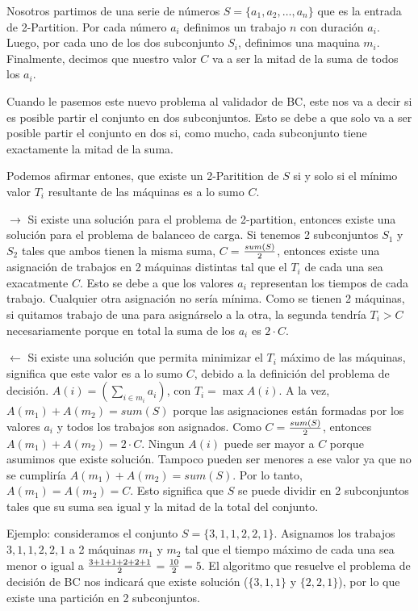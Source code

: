 \documentclass{article}
\begin{document}
Nosotros partimos de una serie de números $S = \{a_1, a_2, \ldots, a_n \}$ que es la entrada de 2-Partition. Por cada número $a_i$ definimos un trabajo $n$ con duración $a_i$.  
Luego, por cada uno de los dos subconjunto $S_i$, definimos una maquina $m_i$. 
Finalmente, decimos que nuestro valor $C$ va a ser la mitad de la suma de todos los $a_i$.

Cuando le pasemos este nuevo problema al validador de BC, este nos va a decir si es posible partir el conjunto en dos subconjuntos. Esto se debe a que solo va a ser posible partir el conjunto en dos si, como mucho, cada subconjunto tiene exactamente la mitad de la suma. 

Podemos afirmar entones, que existe un 2-Paritition de $S$ si y solo si el mínimo valor $T_i$ resultante de las máquinas es a lo sumo $C$.

$\rightarrow$ Si existe una solución para el problema de 2-partition, entonces existe una solución para el problema de balanceo de carga. Si tenemos 2 subconjuntos $S_1$ y $S_2$ tales que ambos tienen la misma suma, $C =$$ sum(S) \over 2$, entonces existe una asignación de trabajos en 2 máquinas distintas tal que el $T_i$ de cada una sea exacatmente $C$. Esto se debe a que los valores $a_i$ representan los tiempos de cada trabajo. Cualquier otra asignación no sería mínima. Como se tienen 2 máquinas, si quitamos trabajo de una para asignárselo a la otra, la segunda tendría $T_i > C$ necesariamente porque en total la suma de los $a_i$ es $2 \cdot C$.

$\leftarrow$ Si existe una solución que permita minimizar el $T_i$ máximo de las máquinas, significa que este valor es a lo sumo $C$, debido a la definición del problema de decisión. $ A(i) = (\displaystyle{\sum_{i \in m_i} a_i})$, con $T_i = \max A(i)$. A la vez, $A(m_1) + A(m_2) = sum(S)$ porque las asignaciones están formadas por los valores $a_i$ y todos los trabajos son asignados. Como $C =$$ sum(S) \over2$, entonces $A(m_1) + A(m_2) = 2 \cdot C$. Ningun $A(i)$ puede ser mayor a $C$ porque asumimos que existe solución. Tampoco pueden ser menores a ese valor ya que no se cumpliría $A(m_1) + A(m_2) = sum(S)$. Por lo tanto, $A(m_1) = A(m_2) = C$. Esto significa que $S$ se puede dividir en 2 subconjuntos tales que su suma sea igual y la mitad de la total del conjunto.

Ejemplo: consideramos el conjunto \(S = \{3, 1, 1, 2, 2, 1\}\). Asignamos los trabajos ${3, 1, 1, 2, 2, 1}$ a 2 máquinas $m_1$ y $m_2$ tal que el tiempo máximo de cada una sea menor o igual a $3 + 1 + 1 + 2 + 2 + 1\over2$$ =$$ 10\over2 $$= 5$. El algoritmo que resuelve el problema de decisión de BC nos indicará que existe solución ($\{3, 1, 1\}$ y $\{2, 2, 1\}$), por lo que existe una partición en 2 subconjuntos.
\end{document}
